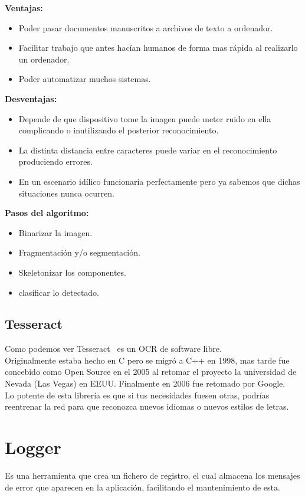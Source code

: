 \textbf{Ventajas:}
\begin{itemize}
\item Poder pasar documentos manuscritos a archivos de texto a ordenador.
\item Facilitar trabajo que antes hacían humanos de forma mas rápida al realizarlo un ordenador.
\item Poder automatizar muchos sistemas.
\end{itemize}

\textbf{Desventajas:}
\begin{itemize}
\item Depende de que dispositivo tome la imagen puede meter ruido en ella complicando o inutilizando el posterior reconocimiento.
\item La distinta distancia entre caracteres puede variar en el reconocimiento produciendo errores.
\item En un escenario idílico funcionaria perfectamente pero ya sabemos que dichas situaciones nunca ocurren.
\end{itemize}

\textbf{Pasos del algoritmo:}
\begin{itemize}
\item Binarizar la imagen.
\item Fragmentación y/o segmentación.
\item Skeletonizar los componentes.
\item clasificar lo detectado.
\end{itemize}

\subsection{Tesseract}
Como podemos ver Tesseract~\cite{wiki:Tesseract} es un OCR de software libre.\\
Originalmente estaba hecho en C pero se migró a C++ en 1998, mas tarde fue concebido como Open Source en el 2005 al retomar el proyecto la universidad de Nevada (Las Vegas) en EEUU. Finalmente en 2006 fue retomado por Google.\\

Lo potente de esta librería es que si tus necesidades fuesen otras, podrías reentrenar la red para que reconozca nuevos idiomas o nuevos estilos de letras.

\section{Logger}
Es una herramienta que crea un fichero de registro, el cual almacena los mensajes de error que aparecen en la aplicación, facilitando el mantenimiento de esta.

